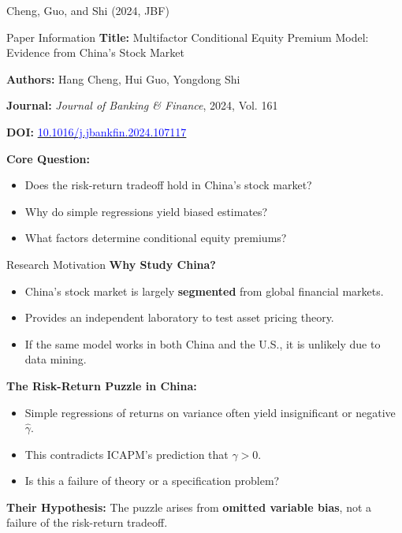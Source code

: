\documentclass{beamer}
\begin{document}

\begin{frame}{Cheng, Guo, and Shi (2024, JBF)}
    \begin{block}{Paper Information}
        \textbf{Title:} Multifactor Conditional Equity Premium Model: Evidence from China's Stock Market
        
        \textbf{Authors:} Hang Cheng, Hui Guo, Yongdong Shi
        
        \textbf{Journal:} \textit{Journal of Banking \& Finance}, 2024, Vol. 161
        
        \textbf{DOI:} \href{https://doi.org/10.1016/j.jbankfin.2024.107117}{\textcolor{blue}{10.1016/j.jbankfin.2024.107117}}
    \end{block}
    
    \vspace{0.3cm}
    \textbf{Core Question:}
    \begin{itemize}
        \item Does the risk-return tradeoff hold in China's stock market?
        \item Why do simple regressions yield biased estimates?
        \item What factors determine conditional equity premiums?
    \end{itemize}
\end{frame}

\begin{frame}{Research Motivation}
    \textbf{Why Study China?}
    \begin{itemize}
        \item China's stock market is largely \textbf{segmented} from global financial markets.
        \item Provides an independent laboratory to test asset pricing theory.
        \item If the same model works in both China and the U.S., it is unlikely due to data mining.
    \end{itemize}
    
    \vspace{0.3cm}
    \textbf{The Risk-Return Puzzle in China:}
    \begin{itemize}
        \item Simple regressions of returns on variance often yield insignificant or negative $\hat{\gamma}$.
        \item This contradicts ICAPM's prediction that $\gamma > 0$.
        \item Is this a failure of theory or a specification problem?
    \end{itemize}
    
    \vspace{0.3cm}
    \textbf{Their Hypothesis:} The puzzle arises from \textbf{omitted variable bias}, not a failure of the risk-return tradeoff.
\end{frame}
\end{document}
